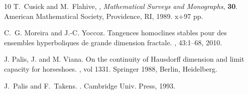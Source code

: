 \documentclass[12pt]{amsart}
\theoremstyle{plain} %
\theoremstyle{definition} %
\numberwithin{equation}{section}
\begin{document}
\begin{thebibliography}{10}
T.~Cusick and M.~Flahive, 
, 
\emph{Mathematical Surveys and Monographs}, \textbf{30}. American Mathematical Society, Providence, RI, 1989. x+97 pp.

C.~G. Moreira and J.-C. Yoccoz.
\newblock Tangences homoclines stables pour des ensembles hyperboliques de
  grande dimension fractale.
,
  43:1--68, 2010.
  
J. Palis, J. and M. Viana.
\newblock On the continuity of Hausdorff dimension and limit capacity for horseshoes.
, vol 1331. Springer 1988, Berlin, Heidelberg.

J.~Palis and F.~Takens.
.
\newblock Cambridge Univ. Press, 1993.




\end{thebibliography}
\end{document}
